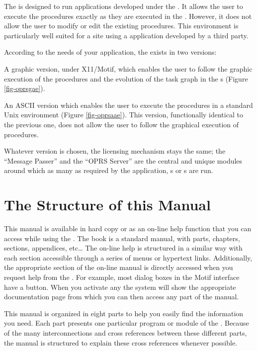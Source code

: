 The \COPRSAE{}  is designed to run \COPRS{} applications developed under the
\COPRSDE{}. It allows the user to execute the procedures exactly as they are
executed in the \COPRSDE{}. However, it does not allow the user to modify or
edit the existing procedures. This environment is particularly well suited for
a site using a \COPRS{} application developed by a third party.

According to the needs of your application, the \COPRSAE{} exists in two versions:

A graphic version, under X11/Motif, which enables the user to follow the
graphic execution of the procedures and the evolution of the task graph in the
\XPK{}s (Figure \ref{fig-oprsgae}).


An ASCII version which enables the user to execute the procedures in a standard
Unix environment (Figure \ref{fig-oprsaae}). This version, functionally
identical to the previous one, does not allow the user to follow the graphical
execution of procedures.


Whatever version is chosen, the licensing mechanism stays the same; the
``Message Passer'' and the ``OPRS Server'' are the central and unique modules
around which as many as required by the application, \CPK{}s or \XPK{}s are
run.

\section{The Structure of this Manual}

This manual is available in hard copy or as an on-line help function that you can access 
while using the
\COPRSDE{}.
The book is a standard manual, with parts, chapters, sections, appendices,
etc\dots{} The on-line help is structured in a similar way with each section
accessible through a series of menus or hypertext links.
Additionally, the appropriate section of the on-line manual is
directly accessed when you request help from the \COPRSDE{}. For example,
most dialog boxes in the Motif interface have a  button. When you activate 
any
 the system will show the appropriate
documentation page from which you can then access any part of the manual.

This manual is organized in eight parts to help you easily find the information you need. 
Each part presents one particular
program or module of the \COPRSDE{}. Because of the many interconnections
and cross references between these different parts, the manual is
structured to explain these cross references whenever
possible.

